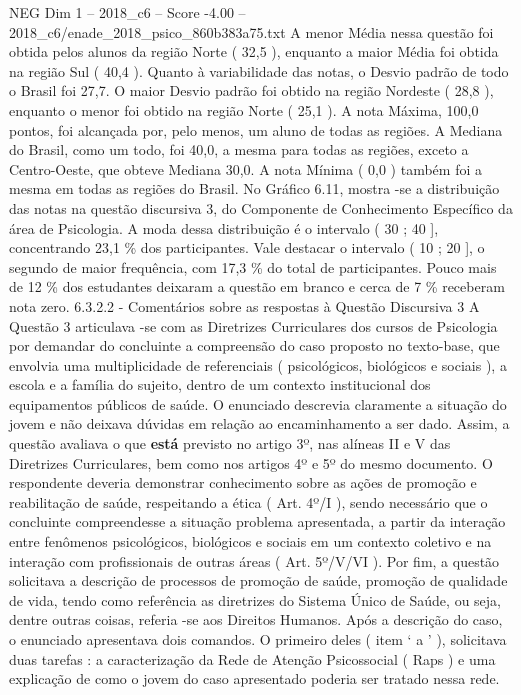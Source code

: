 \begin{textsample}{NEG Dim 1 – 2018\_c6 – Score -4.00 – 2018\_c6/enade\_2018\_psico\_860b383a75.txt}
A menor Média nessa questão foi obtida pelos alunos da região Norte ( 32,5 ), enquanto a maior Média foi obtida na região Sul ( 40,4 ).
Quanto à variabilidade das notas, o Desvio padrão de todo o Brasil foi 27,7.
O maior Desvio padrão foi obtido na região Nordeste ( 28,8 ), enquanto o menor foi obtido na região Norte ( 25,1 ).
A nota Máxima, 100,0 pontos, foi alcançada por, pelo menos, um aluno de todas as regiões.
A Mediana do Brasil, como um todo, foi 40,0, a mesma para todas as regiões, exceto a Centro-Oeste, que obteve Mediana 30,0.
A nota Mínima ( 0,0 ) também foi a mesma em todas as regiões do Brasil.
No Gráfico 6.11, mostra -se a distribuição das notas na questão discursiva 3, do Componente de Conhecimento Específico da área de Psicologia.
A moda dessa distribuição é o intervalo ( 30 ; 40 ], concentrando 23,1 \% dos participantes.
Vale destacar o intervalo ( 10 ; 20 ], o segundo de maior frequência, com 17,3 \% do total de participantes.
Pouco mais de 12 \% dos estudantes deixaram a questão em branco e cerca de 7 \% receberam nota zero. 6.3.2.2 - Comentários sobre as respostas à Questão Discursiva 3 A Questão 3 articulava -se com as Diretrizes Curriculares dos cursos de Psicologia por demandar do concluinte a compreensão do caso proposto no texto-base, que envolvia uma multiplicidade de referenciais ( psicológicos, biológicos e sociais ), a escola e a família do sujeito, dentro de um contexto institucional dos equipamentos públicos de saúde.
O enunciado descrevia claramente a situação do jovem e não deixava dúvidas em relação ao encaminhamento a ser dado.
Assim, a questão avaliava o que \textbf{está} previsto no artigo 3º, nas alíneas II e V das Diretrizes Curriculares, bem como nos artigos 4º e 5º do mesmo documento.
O respondente deveria demonstrar conhecimento sobre as ações de promoção e reabilitação de saúde, respeitando a ética ( Art. 4º/I ), sendo necessário que o concluinte compreendesse a situação problema apresentada, a partir da interação entre fenômenos psicológicos, biológicos e sociais em um contexto coletivo e na interação com profissionais de outras áreas ( Art. 5º/V/VI ).
Por fim, a questão solicitava a descrição de processos de promoção de saúde, promoção de qualidade de vida, tendo como referência as diretrizes do Sistema Único de Saúde, ou seja, dentre outras coisas, referia -se aos Direitos Humanos.
Após a descrição do caso, o enunciado apresentava dois comandos.
O primeiro deles ( item ‘ a ’ ), solicitava duas tarefas : a caracterização da Rede de Atenção Psicossocial ( Raps ) e uma explicação de como o jovem do caso apresentado poderia ser tratado nessa rede.

\end{textsample}
